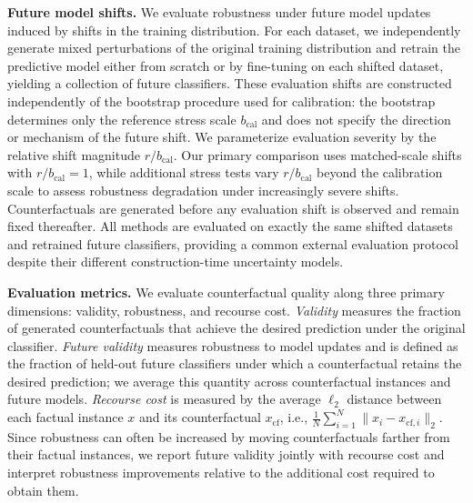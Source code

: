 \textbf{Future model shifts.}
We evaluate robustness under future model updates induced by shifts in the training distribution. For each dataset, we independently generate mixed perturbations of the original training distribution and retrain the predictive model either from scratch or by fine-tuning on each shifted dataset, yielding a collection of future classifiers. These evaluation shifts are constructed independently of the bootstrap procedure used for calibration: the bootstrap determines only the reference stress scale $b_{\mathrm{cal}}$ and does not specify the direction or mechanism of the future shift. We parameterize evaluation severity by the relative shift magnitude $r/b_{\mathrm{cal}}$. Our primary comparison uses matched-scale shifts with $r/b_{\mathrm{cal}}=1$, while additional stress tests vary $r/b_{\mathrm{cal}}$ beyond the calibration scale to assess robustness degradation under increasingly severe shifts. Counterfactuals are generated before any evaluation shift is observed and remain fixed thereafter. All methods are evaluated on exactly the same shifted datasets and retrained future classifiers, providing a common external evaluation protocol despite their different construction-time uncertainty models.

\textbf{Evaluation metrics.}
We evaluate counterfactual quality along three primary dimensions: validity, robustness, and recourse cost. \emph{Validity} measures the fraction of generated counterfactuals that achieve the desired prediction under the original classifier. \emph{Future validity} measures robustness to model updates and is defined as the fraction of held-out future classifiers under which a counterfactual retains the desired prediction; we average this quantity across counterfactual instances and future models. \emph{Recourse cost} is measured by the average $\ell_2$ distance between each factual instance $x$ and its counterfactual $x_{\mathrm{cf}}$, i.e., $\frac{1}{N}\sum_{i=1}^{N}\|x_i-x_{\mathrm{cf},i}\|_2$. Since robustness can often be increased by moving counterfactuals farther from their factual instances, we report future validity jointly with recourse cost and interpret robustness improvements relative to the additional cost required to obtain them.

